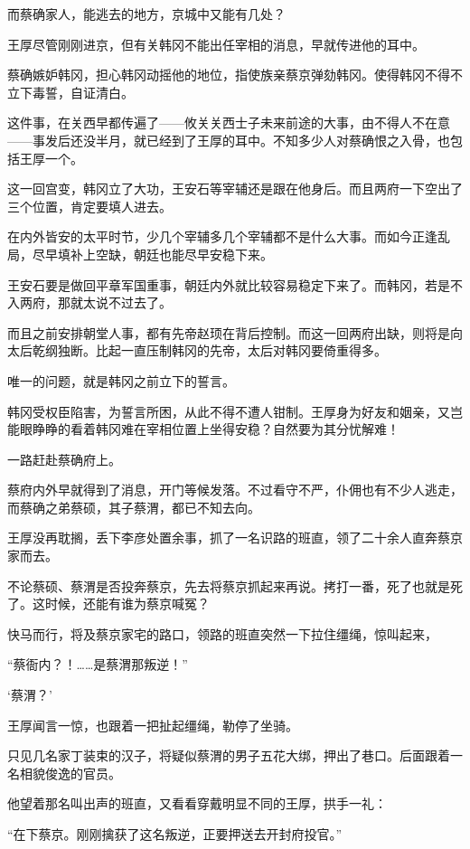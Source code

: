 而蔡确家人，能逃去的地方，京城中又能有几处？

王厚尽管刚刚进京，但有关韩冈不能出任宰相的消息，早就传进他的耳中。

蔡确嫉妒韩冈，担心韩冈动摇他的地位，指使族亲蔡京弹劾韩冈。使得韩冈不得不立下毒誓，自证清白。

这件事，在关西早都传遍了——攸关关西士子未来前途的大事，由不得人不在意——事发后还没半月，就已经到了王厚的耳中。不知多少人对蔡确恨之入骨，也包括王厚一个。

这一回宫变，韩冈立了大功，王安石等宰辅还是跟在他身后。而且两府一下空出了三个位置，肯定要填人进去。

在内外皆安的太平时节，少几个宰辅多几个宰辅都不是什么大事。而如今正逢乱局，尽早填补上空缺，朝廷也能尽早安稳下来。

王安石要是做回平章军国重事，朝廷内外就比较容易稳定下来了。而韩冈，若是不入两府，那就太说不过去了。

而且之前安排朝堂人事，都有先帝赵顼在背后控制。而这一回两府出缺，则将是向太后乾纲独断。比起一直压制韩冈的先帝，太后对韩冈要倚重得多。

唯一的问题，就是韩冈之前立下的誓言。

韩冈受权臣陷害，为誓言所困，从此不得不遭人钳制。王厚身为好友和姻亲，又岂能眼睁睁的看着韩冈难在宰相位置上坐得安稳？自然要为其分忧解难！

一路赶赴蔡确府上。

蔡府内外早就得到了消息，开门等候发落。不过看守不严，仆佣也有不少人逃走，而蔡确之弟蔡硕，其子蔡渭，都已不知去向。

王厚没再耽搁，丢下李彦处置余事，抓了一名识路的班直，领了二十余人直奔蔡京家而去。

不论蔡硕、蔡渭是否投奔蔡京，先去将蔡京抓起来再说。拷打一番，死了也就是死了。这时候，还能有谁为蔡京喊冤？

快马而行，将及蔡京家宅的路口，领路的班直突然一下拉住缰绳，惊叫起来，

“蔡衙内？！……是蔡渭那叛逆！”

‘蔡渭？’

王厚闻言一惊，也跟着一把扯起缰绳，勒停了坐骑。

只见几名家丁装束的汉子，将疑似蔡渭的男子五花大绑，押出了巷口。后面跟着一名相貌俊逸的官员。

他望着那名叫出声的班直，又看看穿戴明显不同的王厚，拱手一礼：

“在下蔡京。刚刚擒获了这名叛逆，正要押送去开封府投官。”
